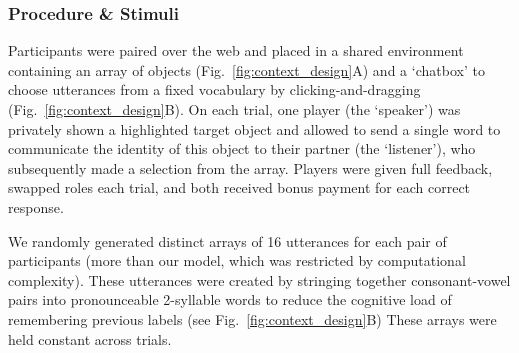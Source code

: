 \subsubsection{Procedure \& Stimuli}
Participants were paired over the web and placed in a shared environment containing an array of objects (Fig.~\ref{fig:context_design}A) and a `chatbox' to choose utterances from a fixed vocabulary by clicking-and-dragging (Fig.~\ref{fig:context_design}B). On each trial, one player (the `speaker') was privately shown a highlighted target object and allowed to send a single word to communicate the identity of this object to their partner (the `listener'), who subsequently made a selection from the array. Players were given full feedback, swapped roles each trial, and both received bonus payment for each correct response.

We randomly generated distinct arrays of 16 utterances for each pair of participants (more than our model, which was restricted by computational complexity).
These utterances were created by stringing together consonant-vowel pairs into pronounceable 2-syllable words to reduce the cognitive load of remembering previous labels (see Fig.~\ref{fig:context_design}B)
These arrays were held constant across trials.

